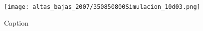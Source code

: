 \begin{figure}[H]
    \centering
    \texttt{[image: altas\_bajas\_2007/350850800Simulacion\_10d03.png]}
    \caption{Caption}
    \label{fig:my_label}
\end{figure}



\begin{comment}






\section{Lecturas del páramo}

La inicialización de los modelos juega un papel importante en el pronóstico de los eventos, por ejemplo \citet{Uribe2012} encontró que para un horizonte de pronóstico de 36 horas se deben descartar las primeras 12 horas para evitar el efecto de \textit{spin-up}.

Según \citep{Uribe2012} el anidamiento no mejora la influencia de la predicción, lo cual traduce en una perdida de tiempo para la predicción de lluvias en Colombia.

Según \citep{Uribe2012} la parametrización por el método de Kain-Fritschc con una resolución de 20 km de grilla presentó la mayor subestimación para la precipitación.

Al aumentar el horizonte de pronóstico de 36 a 48 horas se logra una mejor simulación de los valores de precipitación \citep{Uribe2012}.



\subsection{Prioridades de restauración ecológica}




Según el enfoque de \citep{Castro-Romero2014} cuando un suelo en una zona pierde atributos como el contenido de materia orgánica y la diversidad de especies de artropofauna, el suelo se degrada. Y esta degradación es considerada como una perdida paulatina de capital natural, que produce que sus habitantes perciban menos beneficios por los servicios ecosistémicos y una disminución en la calidad de vida de sus pobladores. Esto hace que las actividades agropecuarias sean más difíciles y costosas.
Estas teorías se basan en estudios previos de \citet{daily1997nature} y \citet{westman1977much}.


\end{comment}
